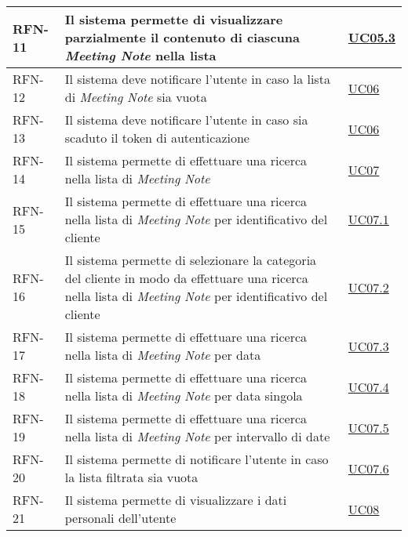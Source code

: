 \begin{table}
\begin{tabularx}{\textwidth}{lXl}
\hline
RFN-11 \label{RFN-11} & Il sistema permette di visualizzare parzialmente il contenuto di ciascuna \emph{Meeting Note} nella lista & \hyperref[UC05.3]{UC05.3} \\
\hline
RFN-12 \label{RFN-12} & Il sistema deve notificare l'utente in caso la lista di \emph{Meeting Note} sia vuota & \hyperref[UC06]{UC06} \\
\hline
RFN-13 \label{RFN-13} & Il sistema deve notificare l'utente in caso sia scaduto il token di autenticazione & \hyperref[UC06]{UC06} \\ %
\hline
RFN-14 \label{RFN-14} & Il sistema permette di effettuare una ricerca nella lista di \emph{Meeting Note} & \hyperref[UC07]{UC07} \\
\hline
RFN-15 \label{RFN-15} & Il sistema permette di effettuare una ricerca nella lista di \emph{Meeting Note} per identificativo del cliente & \hyperref[UC07.1]{UC07.1} \\
\hline
RFN-16 \label{RFN-16} & Il sistema permette di selezionare la categoria del cliente in modo da effettuare una ricerca nella lista di \emph{Meeting Note} per identificativo del cliente & \hyperref[UC07.2]{UC07.2} \\
\hline
RFN-17 \label{RFN-17} & Il sistema permette di effettuare una ricerca nella lista di \emph{Meeting Note} per data & \hyperref[UC07.3]{UC07.3} \\
\hline
RFN-18 \label{RFN-18} & Il sistema permette di effettuare una ricerca nella lista di \emph{Meeting Note} per data singola & \hyperref[UC07.4]{UC07.4} \\
\hline
RFN-19 \label{RFN-19} & Il sistema permette di effettuare una ricerca nella lista di \emph{Meeting Note} per intervallo di date & \hyperref[UC07.5]{UC07.5} \\
\hline
RFN-20 \label{RFN-20} & Il sistema permette di notificare l'utente in caso la lista filtrata sia vuota & \hyperref[UC07.6]{UC07.6} \\
\hline
RFN-21 \label{RFN-21} & Il sistema permette di visualizzare i dati personali dell'utente & \hyperref[UC08]{UC08} \\
\hline
\end{tabularx}
\end{table}

\clearpage


